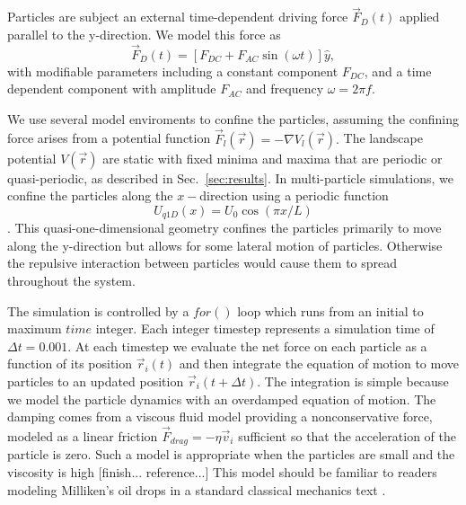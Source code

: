 \documentclass[twocolumn,preprintnumbers,amsmath,amssymb,aps,prx]{revtex4}
\begin{document}
Particles are subject an external time-dependent driving force
$\vec{F}_{D}(t)$
applied parallel to the y-direction.
We model this force as
\begin{equation}
\vec{F}_{D}(t) = [F_{DC} + F_{AC} \sin(\omega t)] \hat{y},
\end{equation}
with modifiable parameters including
a constant component $F_{DC}$,
and a time dependent component with amplitude $F_{AC}$
and frequency $\omega = 2 \pi f$.

We use several model enviroments to confine the particles,
assuming the confining force arises from a potential function 
 $\vec{F}_{l}(\vec{r}) = -\nabla V_l(\vec{r}).$
 The landscape potential $V(\vec{r}) $ are static 
 with fixed minima and maxima
 that are periodic or quasi-periodic,
 as described in Sec.~\ref{sec:results}.
% 
%
 In multi-particle simulations, we confine
 the particles along the $x-$direction 
 using a periodic function 
 \begin{equation}
   U_{q1D}(x) = U_0 \cos{(\pi x / L)}
 \end{equation}.
 This 
 quasi-one-dimensional geometry
 confines the particles
 primarily to move 
 along the y-direction
 but allows for some lateral motion of particles.
 Otherwise the repulsive interaction between
 particles would cause them to spread throughout the system.

 

The simulation is controlled by a $for()$ loop
which runs from an initial to maximum $time$ integer.
Each integer timestep
represents a simulation time of $\Delta t=0.001$.
At each timestep
we evaluate the net force on each particle as a function of its position
$\vec{r}_i(t)$
and then integrate
the equation of motion to move particles
to an updated position
$\vec{r}_i(t+\Delta t)$.
%
The integration is simple
because 
we model the 
particle dynamics 
with an overdamped
equation of motion.
The damping comes from a viscous fluid model
providing a nonconservative force,
modeled as a linear friction $\vec{F}_{drag} = -\eta \vec{v}_i$
sufficient so that
the acceleration of the particle is zero.
Such a model is appropriate when the particles
are small and the viscosity is high [finish... reference...]
This model should be familiar to readers
modeling Milliken's oil drops
in a standard classical mechanics text \cite{Taylor2005}.
\end{document}

